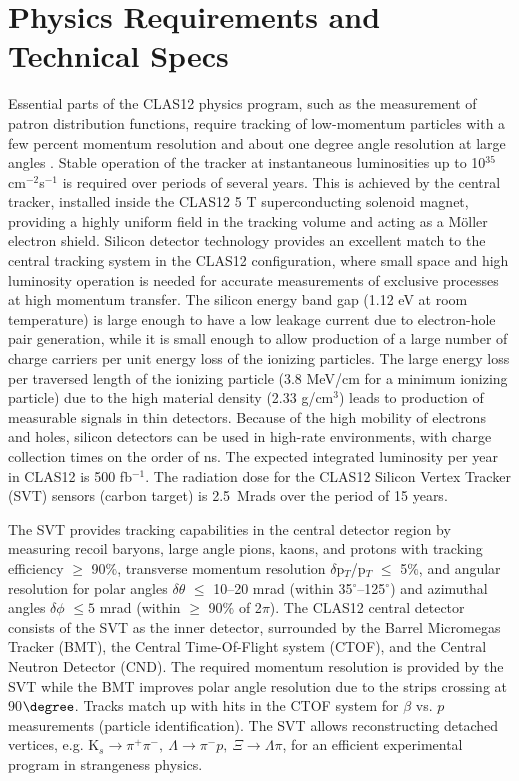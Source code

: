 \section{Physics Requirements and Technical Specs}
Essential parts of the CLAS12 physics program, such as the measurement of patron distribution functions, require tracking of low-momentum  particles with a few percent momentum resolution and about one degree angle resolution at large angles \cite{TDR12}. Stable operation of the tracker at instantaneous luminosities up to 10$^{35}~$cm$^{-2}$s$^{-1}$ is required over periods of several years. This is achieved by the central tracker, installed inside the CLAS12 5 T superconducting solenoid magnet,  providing a highly uniform field in the tracking volume and acting as a M\"oller electron shield. Silicon detector technology provides an excellent match to the central tracking system in the CLAS12 configuration, where small space and high luminosity operation is needed for accurate measurements of exclusive processes at high momentum transfer. The silicon energy band gap (1.12 eV at room temperature) is large enough to have a low leakage current due to electron-hole pair generation, while it is small enough to allow production of a large number of charge carriers per unit energy loss of the ionizing particles. The large energy loss per traversed length of the ionizing particle (3.8 MeV/cm for a minimum ionizing particle) due to the high material density (2.33 g/cm$^3$) leads to production of  measurable signals in thin detectors. Because of the high mobility of electrons and holes, silicon detectors can be used in high-rate environments, with charge collection times on the order of ns. The expected integrated luminosity per year in CLAS12 is 500 fb$^{-1}$. The radiation dose for the CLAS12 Silicon Vertex Tracker (SVT) sensors (carbon target) is 2.5~Mrads over the period of 15 years.

The SVT provides tracking capabilities in the central detector region by measuring recoil baryons, large angle pions,  kaons, and protons with tracking efficiency $\ge$ 90$\%$, transverse momentum resolution $\delta$p$_{T}$/p$_{T}$ $\le$ 5$\%$, and angular resolution for polar angles $\delta$$\theta$ $\le$ 10--20 mrad (within 35$^\circ$--125$^\circ$) and azimuthal angles $\delta$$\phi$ $\le5$ mrad (within $\ge$ 90$\%$ of 2$\pi$). The CLAS12 central detector consists of the SVT as the inner detector, surrounded by the Barrel Micromegas Tracker (BMT), the Central Time-Of-Flight system (CTOF), and the Central Neutron Detector (CND). The required momentum resolution is provided by the SVT while the BMT improves polar angle resolution due to the strips crossing at 90$\degree$. Tracks match up with hits in the CTOF system for $\beta$ vs. $p$ measurements (particle identification). The SVT allows reconstructing detached vertices, e.g. K$_{s}\!\to\!\pi^{+}\pi^{-},~\Lambda\!\to\!\pi^{-}p,~\Xi\!\to\!\Lambda\pi$, for an efficient experimental program in strangeness physics.  

